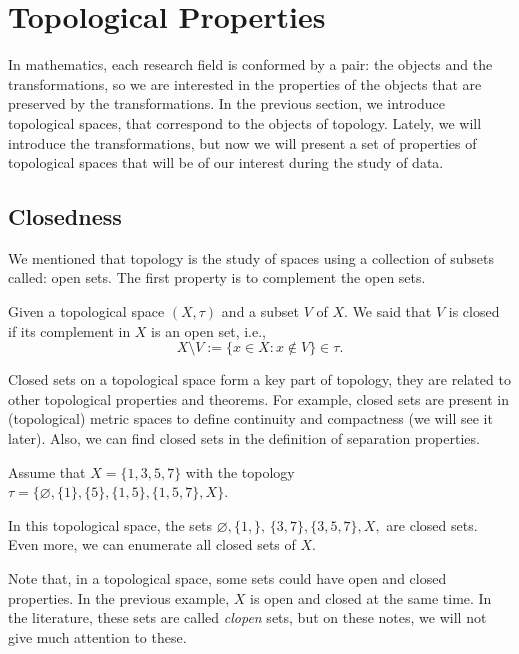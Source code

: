 \documentclass[
	fontsize=10pt, %
	twoside=false, %
	secnumdepth=1, %
]{kaobook}
\begin{document}
\section{Topological Properties}

In mathematics, each research field is conformed by a pair: the objects and the transformations, so we are interested in the properties of the objects that are preserved by the transformations. In the previous section, we introduce topological spaces, that correspond to the objects of topology. Lately, we will introduce the transformations, but now we will present a set of properties of topological spaces that will be of our interest during the study of data.


\subsection{Closedness}

We mentioned that topology is the study of spaces using a collection of subsets called: open sets. The first property is to complement the open sets. 

\begin{definition} 
Given a topological space $(X,\tau)$ and a subset $V$ of $X.$ We said that $V$ is closed if its complement in $X$ is an open set, i.e., $$X\setminus V:= \{x\in X: x\not\in V\}\in \tau.$$
\end{definition}

Closed sets on a topological space form a key part of topology, they are related to other topological properties and theorems. For example, closed sets are present in (topological) metric spaces to define continuity and compactness (we will see it later). Also, we can find closed sets in the definition of separation properties. 

\begin{example}
Assume that $X=\{1,3,5,7\}$ with the topology $\tau=\{\varnothing,\{1\},\{5\},\{1,5\},\{1,5,7\},X\}.$ 

In this topological space, the sets $\varnothing, \{1,\},\,\{3,7\},\{3,5,7\}, X,$ are closed sets. Even more, we can enumerate all closed sets of $X.$ 
\end{example}

Note that, in a topological space, some sets could have open and closed properties. In the previous example, $X$ is open and closed at the same time. In the literature, these sets are called \emph{clopen} sets, but on these notes, we will not give much attention to these.
\end{document}
